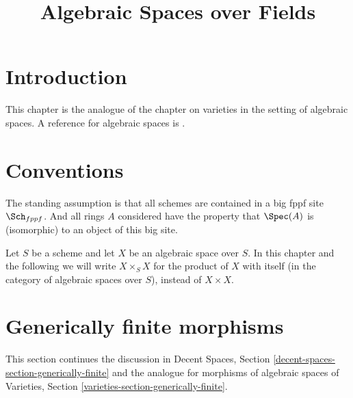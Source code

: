 

%


\title{Algebraic Spaces over Fields}


\maketitle

\label{section-phantom}

\tableofcontents

\section{Introduction}
\label{section-introduction}

\noindent
This chapter is the analogue of the chapter on varieties in the setting
of algebraic spaces. A reference for algebraic spaces is
\cite{Kn}.


\section{Conventions}
\label{section-conventions}

\noindent
The standing assumption is that all schemes are contained in
a big fppf site $\Sch_{fppf}$. And all rings $A$ considered
have the property that $\Spec(A)$ is (isomorphic) to an
object of this big site.

\medskip\noindent
Let $S$ be a scheme and let $X$ be an algebraic space over $S$.
In this chapter and the following we will write $X \times_S X$
for the product of $X$ with itself (in the category of algebraic
spaces over $S$), instead of $X \times X$.



\section{Generically finite morphisms}
\label{section-generically-finite}

\noindent
This section continues the discussion in
Decent Spaces, Section \ref{decent-spaces-section-generically-finite}
and the analogue for morphisms of algebraic spaces of
Varieties, Section \ref{varieties-section-generically-finite}.

